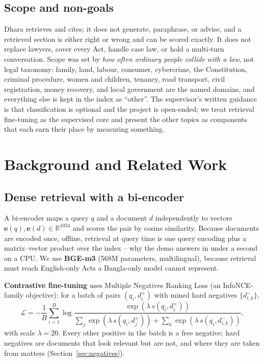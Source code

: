 \documentclass[10pt,a4paper]{article}
\begin{document}
\subsection{Scope and non-goals}
Dhara retrieves and cites; it does not generate, paraphrase, or advise, and a retrieved section is either right or wrong and can be scored exactly. It does not replace lawyers, cover every Act, handle case law, or hold a multi-turn conversation. Scope was set by \emph{how often ordinary people collide with a law}, not legal taxonomy: family, land, labour, consumer, cybercrime, the Constitution, criminal procedure, women and children, tenancy, road transport, civil registration, money recovery, and local government are the named domains, and everything else is kept in the index as ``other''. The supervisor's written guidance is that classification is optional and the project is open-ended; we treat retrieval fine-tuning as the supervised core and present the other topics as components that each earn their place by measuring something.

\section{Background and Related Work}

\subsection{Dense retrieval with a bi-encoder}
A bi-encoder maps a query $q$ and a document $d$ independently to vectors $\mathbf{e}(q),\mathbf{e}(d)\in\mathbb{R}^{1024}$ and scores the pair by cosine similarity. Because documents are encoded once, offline, retrieval at query time is one query encoding plus a matrix--vector product over the index -- why the demo answers in under a second on a CPU. We use \textbf{BGE-m3} (568M parameters, multilingual), because retrieval must reach English-only Acts a Bangla-only model cannot represent.

\textbf{Contrastive fine-tuning} uses Multiple Negatives Ranking Loss (an InfoNCE-family objective): for a batch of pairs $(q_i,d_i^{+})$ with mined hard negatives $\{d_{i,k}^{-}\}$,
\begin{equation}
\mathcal{L}=-\frac{1}{B}\sum_{i=1}^{B}\log\frac{\exp(\lambda\, s(q_i,d_i^{+}))}{\sum_{j}\exp(\lambda\, s(q_i,d_j^{+}))+\sum_{k}\exp(\lambda\, s(q_i,d_{i,k}^{-}))},
\end{equation}
with scale $\lambda{=}20$. Every other positive in the batch is a free negative; hard negatives are documents that look relevant but are not, and where they are taken from matters (Section~\ref{sec:negatives}).
\end{document}
